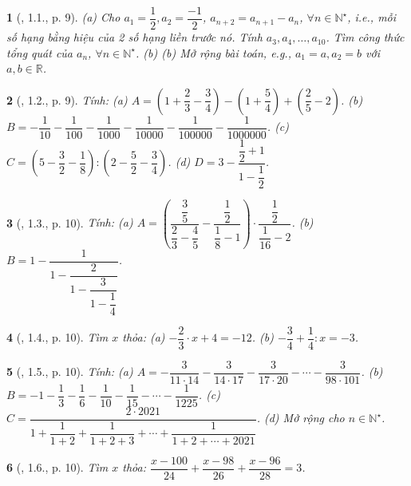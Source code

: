 \documentclass{article}
\newtheorem{baitoan}{}
\begin{document}
\begin{baitoan}[\cite{Binh_boi_duong_Toan_7_tap_1}, 1.1., p. 9]
	(a) Cho $a_1 = \dfrac{1}{2},a_2 = \dfrac{-1}{2}$, $a_{n+2} = a_{n+1} - a_n$, $\forall n\in\mathbb{N}^\star$, i.e., mỗi số hạng bằng hiệu của 2 số hạng liền trước nó. Tính $a_3,a_4,\ldots,a_{10}$. Tìm công thức tổng quát của $a_n$, $\forall n\in\mathbb{N}^\star$. (b) (b) Mở rộng bài toán, e.g., $a_1 = a,a_2 = b$ với $a,b\in\mathbb{R}$.
\end{baitoan}

\begin{baitoan}[\cite{Binh_boi_duong_Toan_7_tap_1}, 1.2., p. 9]
	Tính: (a) $A = \left(1 + \dfrac{2}{3} - \dfrac{3}{4}\right) - \left(1 + \dfrac{5}{4}\right) + \left(\dfrac{2}{5} - 2\right)$. (b) $B = -\dfrac{1}{10} - \dfrac{1}{100} - \dfrac{1}{1000} - \dfrac{1}{10000} - \dfrac{1}{100000} - \dfrac{1}{1000000}$. (c) $C = \left(5 - \dfrac{3}{2} - \dfrac{1}{8}\right):\left(2 - \dfrac{5}{2} - \dfrac{3}{4}\right)$. (d) $D = 3 - \dfrac{\dfrac{1}{2} + 1}{1 - \dfrac{1}{2}}$.
\end{baitoan}

\begin{baitoan}[\cite{Binh_boi_duong_Toan_7_tap_1}, 1.3., p. 10]
	Tính: (a) $A = \left(\dfrac{\dfrac{3}{5}}{\dfrac{2}{3} - \dfrac{4}{5}} - \dfrac{\dfrac{1}{2}}{\dfrac{1}{8} - 1}\right)\cdot\dfrac{\dfrac{1}{2}}{\dfrac{1}{16} - 2}$. (b) $B = 1 - \dfrac{1}{1 - \dfrac{2}{1 - \dfrac{3}{1 - \dfrac{1}{4}}}}$.
\end{baitoan}

\begin{baitoan}[\cite{Binh_boi_duong_Toan_7_tap_1}, 1.4., p. 10]
	Tìm $x$ thỏa: (a) $-\dfrac{2}{3}\cdot x + 4 = -12$. (b) $-\dfrac{3}{4} + \dfrac{1}{4}:x = -3$.
\end{baitoan}

\begin{baitoan}[\cite{Binh_boi_duong_Toan_7_tap_1}, 1.5., p. 10]
	Tính: (a) $A = -\dfrac{3}{11\cdot14} - \dfrac{3}{14\cdot17} - \dfrac{3}{17\cdot20} - \cdots - \dfrac{3}{98\cdot101}$. (b) $B = -1 - \dfrac{1}{3} - \dfrac{1}{6} - \dfrac{1}{10} - \dfrac{1}{15} - \cdots - \dfrac{1}{1225}$. (c) $C = \dfrac{2\cdot2021}{1 + \dfrac{1}{1 + 2} + \dfrac{1}{1 + 2 + 3} + \cdots + \dfrac{1}{1 + 2 + \cdots + 2021}}$. (d) Mở rộng cho $n\in\mathbb{N}^\star$.
\end{baitoan}

\begin{baitoan}[\cite{Binh_boi_duong_Toan_7_tap_1}, 1.6., p. 10]
	Tìm $x$ thỏa: $\dfrac{x - 100}{24} + \dfrac{x - 98}{26} + \dfrac{x - 96}{28} = 3$.
\end{baitoan}
\end{document}
